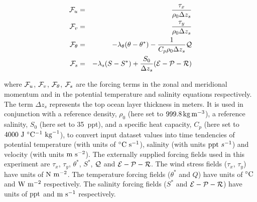 \begin{eqnarray}
\label{EQ:eg-hs-global_forcing}
\label{EQ:eg-hs-global_forcing_fu}
{\cal F}_{u} & = & \frac{\tau_{x}}{\rho_{0} \Delta z_{s}}
\\
\label{EQ:eg-hs-global_forcing_fv}
{\cal F}_{v} & = & \frac{\tau_{y}}{\rho_{0} \Delta z_{s}}
\\
\label{EQ:eg-hs-global_forcing_ft}
{\cal F}_{\theta} & = & - \lambda_{\theta} ( \theta - \theta^{\ast} ) 
 - \frac{1}{C_{p} \rho_{0} \Delta z_{s}}{\cal Q}
\\
\label{EQ:eg-hs-global_forcing_fs}
{\cal F}_{s} & = & - \lambda_{s} ( S - S^{\ast} ) 
 + \frac{S_{0}}{\Delta z_{s}}({\cal E} - {\cal P} - {\cal R})
\end{eqnarray}

\noindent where ${\cal F}_{u}$, ${\cal F}_{v}$, ${\cal F}_{\theta}$,
${\cal F}_{s}$ are the forcing terms in the zonal and meridional
momentum and in the potential temperature and salinity
equations respectively.
The term $\Delta z_{s}$ represents the top ocean layer thickness in
meters.
It is used in conjunction with a reference density, $\rho_{0}$
(here set to $999.8\,{\rm kg\,m^{-3}}$), a
reference salinity, $S_{0}$ (here set to 35~ppt),
and a specific heat capacity, $C_{p}$ (here set to
$4000~{\rm J}~^{\circ}{\rm C}^{-1}~{\rm kg}^{-1}$), to convert
input dataset values into time tendencies of
potential temperature (with units of $^{\circ}{\rm C}~{\rm s}^{-1}$),
salinity (with units ${\rm ppt}~s^{-1}$) and
velocity (with units ${\rm m}~{\rm s}^{-2}$).
The externally supplied forcing fields used in this
experiment are $\tau_{x}$, $\tau_{y}$, $\theta^{\ast}$, $S^{\ast}$,
$\cal{Q}$ and $\cal{E}-\cal{P}-\cal{R}$. The wind stress fields ($\tau_x$, $\tau_y$)
have units of ${\rm N}~{\rm m}^{-2}$. The temperature forcing fields
($\theta^{\ast}$ and $Q$) have units of $^{\circ}{\rm C}$ and ${\rm W}~{\rm m}^{-2}$
respectively. The salinity forcing fields ($S^{\ast}$ and 
$\cal{E}-\cal{P}-\cal{R}$) have units of ${\rm ppt}$ and ${\rm m}~{\rm s}^{-1}$
respectively.
\\


